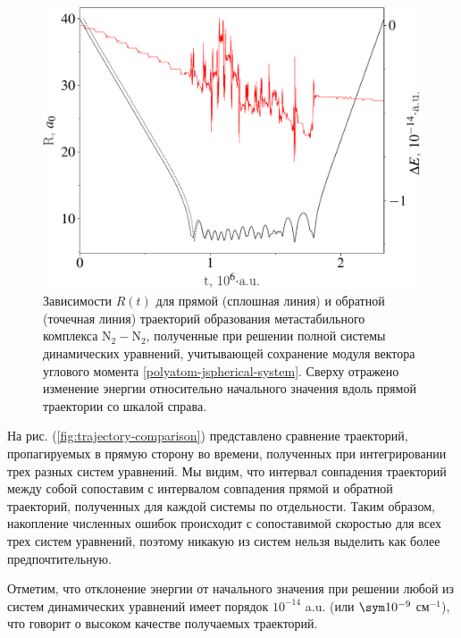 \begin{figure}[H]
    \centering
    \includegraphics[width=0.85\linewidth]{./pictures/trajectories/spherical_trajectory-crop.pdf}
    \caption{Зависимости $R(t)$ для прямой (сплошная линия) и обратной (точечная линия) траекторий образования метастабильного комплекса N$_2-$N$_2$, полученные при решении полной системы динамических уравнений, учитывающей сохранение модуля вектора углового момента \eqref{polyatom-jspherical-system}. Сверху отражено изменение энергии относительно начального значения вдоль прямой траектории со шкалой справа.}
    \label{fig:jspherical-trajectory}
\end{figure}

На рис. (\ref{fig:trajectory-comparison}) представлено сравнение траекторий, пропагируемых в прямую сторону во времени, полученных при интегрировании трех разных систем уравнений. Мы видим, что интервал совпадения траекторий между собой сопоставим с интервалом совпадения прямой и обратной траекторий, полученных для каждой системы по отдельности. Таким образом, накопление численных ошибок происходит с сопоставимой скоростью для всех трех систем уравнений, поэтому никакую из систем нельзя выделить как более предпочтительную. \par
Отметим, что отклонение энергии от начального значения при решении любой из систем динамических уравнений имеет порядок $10^{-14}$ a.u. (или $\sym 10^{-9}$ см$^{-1}$), что говорит о высоком качестве получаемых траекторий.  

